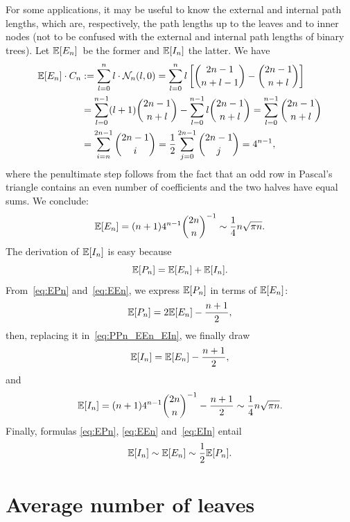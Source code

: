 For some applications, it may be useful to know the external and
internal path lengths, which are, respectively, the path lengths up to
the leaves and to inner nodes (not to be confused with the external
and internal path lengths of binary trees). Let \(\mathbb{E}[{E_n}]\)~be
the former and \(\mathbb{E}[{I_n}]\) the latter. We have
\begin{align*}
\mathbb{E}[{E_n}] \cdot C_n
  &:= \sum_{l=0}^{n} l \cdot \mathcal{N}_n(l,0)
   = \sum_{l=0}^{n}l\left[\binom{2n-1}{n+l-1} -
     \binom{2n-1}{n+l}\right]\\
  &= \sum_{l=0}^{n-1}(l+1)\binom{2n-1}{n+l} -
     \sum_{l=0}^{n-1}l \binom{2n-1}{n+l}
   = \sum_{l=0}^{n-1}\binom{2n-1}{n+l}\\
  &= \sum_{i=n}^{2n-1}\binom{2n-1}{i}
   = \frac{1}{2}\sum_{j=0}^{2n-1}\binom{2n-1}{j} = 4^{n-1},
\end{align*}
where the penultimate step follows from the fact that an odd row in
Pascal's triangle contains an even number of coefficients and the two
halves have equal sums. We conclude:
\begin{equation}
\mathbb{E}[{E_n}] = (n+1) 4^{n-1}\binom{2n}{n}^{-1} \sim
\frac{1}{4}n\sqrt{\pi n}.
\label{eq:EEn}
\end{equation}
The derivation of \(\mathbb{E}[{I_n}]\) is easy because
\begin{equation}
\mathbb{E}[{P_n}] = \mathbb{E}[{E_n}] + \mathbb{E}[{I_n}].
\label{eq:PPn_EEn_EIn}
\end{equation}
From~\eqref{eq:EPn} and~\eqref{eq:EEn}, we express \(\mathbb{E}[{P_n}]\)
in terms of \(\mathbb{E}[{E_n}]\):
\begin{equation*}
\mathbb{E}[{P_n}] = 2 \mathbb{E}[{E_n}] - \frac{n+1}{2},
\end{equation*}
then, replacing it in~\eqref{eq:PPn_EEn_EIn}, we finally draw
\begin{equation*}
\mathbb{E}[{I_n}] = \mathbb{E}[{E_n}] - \frac{n+1}{2},
\end{equation*}
and
\begin{equation}
\mathbb{E}[{I_n}]
  = (n+1)4^{n-1}\binom{2n}{n}^{-1} - \frac{n+1}{2} \sim
  \frac{1}{4}n\sqrt{\pi n}.
\label{eq:EIn}
\end{equation}
Finally, formulas \eqref{eq:EPn}, \eqref{eq:EEn} and~\eqref{eq:EIn}
entail
\begin{equation*}
\mathbb{E}[{I_n}] \sim \mathbb{E}[{E_n}] \sim \frac{1}{2}\mathbb{E}[{P_n}].
\end{equation*}

\section{Average number of leaves}

